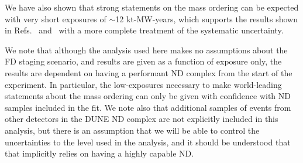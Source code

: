 We have also shown that strong statements on the mass ordering can be expected with very short exposures of $\sim$12 kt-MW-years, which supports the results shown in Refs.~\cite{Abi:2020qib} and~\cite{Abi:2020evt} with a more complete treatment of the systematic uncertainty.

We note that although the analysis used here makes no assumptions about the FD staging scenario, and results are given as a function of exposure only, the results are dependent on having a performant ND complex from the start of the experiment. In particular, the low-exposures necessary to make world-leading statements about the mass ordering can only be given with confidence with ND samples included in the fit. We note also that additional samples of events from other detectors in the DUNE ND complex are not explicitly included in this analysis, but there is an assumption that we will be able to control the uncertainties to the level used in the analysis, and it should be understood that that implicitly relies on having a highly capable ND.
